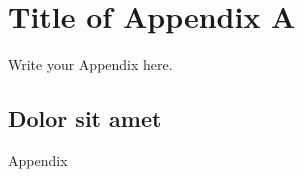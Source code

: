 \clearpage
{}


\singlespacing
\newpage
{}
\renewcommand\bibname{References}	%


\clearpage
{}

\BeginAppendixChapter				%
\SetupAppendixNumberingFormat		%
\newpage
{}
\chapter{Title of Appendix A}

Write your Appendix here.

  \section{Dolor sit amet}
    Appendix

\clearpage
{}

